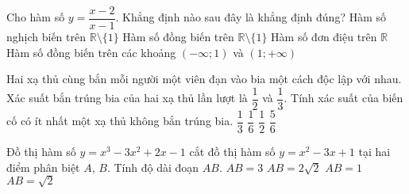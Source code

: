 \begin{ex}%
Cho hàm số $y=\dfrac{x-2}{x-1}$. Khẳng định nào sau đây là khẳng định đúng?
\choice
{Hàm số nghịch biến trên $\mathbb{R}\setminus \{1\}$}
{Hàm số đồng biến trên $\mathbb{R}\setminus \{1\}$}
{Hàm số đơn điệu trên $\mathbb{R}$}
{\True Hàm số đồng biến trên các khoảng $(-\infty;1)$ và $(1;+\infty)$}
\end{ex}
\begin{ex}%
Hai xạ thủ cùng bắn mỗi người một viên đạn vào bia một cách độc lập với nhau. Xác suất bắn trúng bia của hai xạ thủ lần lượt là $\dfrac{1}{2}$ và $\dfrac{1}{3}$. Tính xác suất của biến cố có ít nhất một xạ thủ không bắn trúng bia.
\choice
{$\dfrac{1}{3}$}
{$\dfrac{1}{6}$}
{$\dfrac{1}{2}$}
{\True $\dfrac{5}{6}$}
\end{ex}
\begin{ex}%
Đồ thị hàm số $y=x^3-3x^2+2x-1$ cắt đồ thị hàm số $y=x^2-3x+1$ tại hai điểm phân biệt $A$, $B$. Tính độ dài đoạn $AB$.
\choice
{$AB=3$}
{$AB=2\sqrt 2$}
{\True $AB=1$}
{$AB=\sqrt{2}$}
\end{ex}

